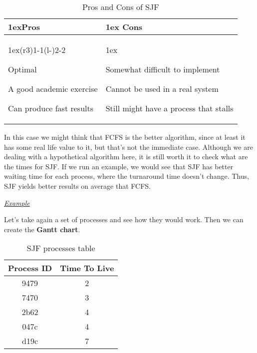 \documentclass{article}
\begin{document}
\begin{table}[h!]
  \begin{tabularx}{\linewidth}{>{\parskip1ex}X@{\kern4\tabcolsep}>{\parskip1ex}X}
    \toprule
    \hfil\bfseries Pros & \hfil\bfseries Cons \\
    \cmidrule(r{3\tabcolsep}){1-1}\cmidrule(l{-\tabcolsep}){2-2}

    Optimal\par
    A good academic exercise\par
    Can produce fast results\par

    &

    Somewhat difficult to implement\par
    Cannot be used in a real system\par
    Still might have a process that stalls \\
    \bottomrule
  \end{tabularx}
  \caption{Pros and Cons of SJF}
\end{table}

In this case we might think that FCFS is the better algorithm, since at least it has some real life value to it, but that's not the immediate case. Although we are dealing with a hypothetical algorithm here, it is still worth it to check what are the times for SJF. If we run an example, we would see that SJF has better waiting time for each process, where the turnaround time doesn't change. Thus, SJF yields better results on average that FCFS.

\underline{\textit{Example}}

Let's take again a set of processes and see how they would work. Then we can create the \textbf{Gantt chart}.

\begin{table}[h!]
  \begin{center}
    \label{tab:SJF processes}
    \begin{tabular}{c|c}
      \toprule
      \textbf{Process ID} & \textbf{Time To Live} \\
      \midrule
      9479 & 2 \\
      7470 & 3 \\
      2b62 & 4 \\
      047c & 4 \\
      d19c & 7 \\
      \bottomrule
    \end{tabular}
    \caption{SJF processes table}
  \end{center}
\end{table}
\end{document}
